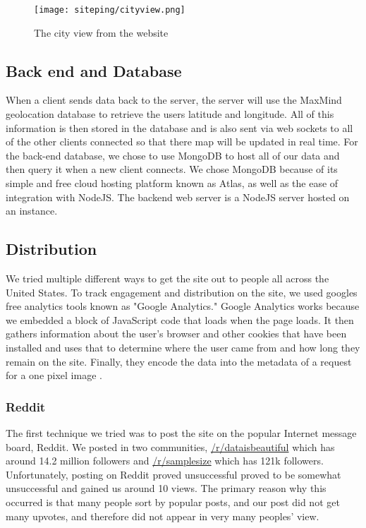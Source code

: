 \begin{figure}
    \centering
    \texttt{[image: siteping/cityview.png]}
    \caption{The city view from the website}
    \label{fig:siteping_city}
\end{figure}

\subsection{Back end and Database}

When a client sends data back to the server, the server will use the MaxMind \ip geolocation database to retrieve the users latitude and longitude. All of this information is then stored in the database and is also sent via web sockets to all of the other clients connected so that there map will be updated in real time. For the back-end database, we chose to use MongoDB to host all of our data and then query it when a new client connects. We chose MongoDB because of its simple and free cloud hosting platform known as Atlas, as well as the ease of integration with NodeJS. The backend web server is a NodeJS server hosted on an \ecc instance.

\subsection{Distribution}

We tried multiple different ways to get the site out to people all across the United States. To track engagement and distribution on the site, we used googles free analytics tools known as "Google Analytics." Google Analytics works because we embedded a block of JavaScript code that loads when the page loads. It then gathers information about the user's browser and other cookies that have been installed and uses that to determine where the user came from and how long they remain on the site. Finally, they encode the data into the metadata of a request for a one pixel image \cite{GoogleGoogleOverview}.

\subsubsection{Reddit}

The first technique we tried was to post the site on the popular Internet message board, Reddit. We posted in two communities, \href{https://reddit.com/r/dataisbeautiful}{/r/dataisbeautiful} which has around 14.2 million followers and \href{https://reddit.com/r/samplesize}{/r/samplesize} which has 121k followers. Unfortunately, posting on Reddit proved unsuccessful proved to be somewhat unsuccessful and gained us around 10 views. The primary reason why this occurred is that many people sort by popular posts, and our post did not get many upvotes, and therefore did not appear in very many peoples' view. 

